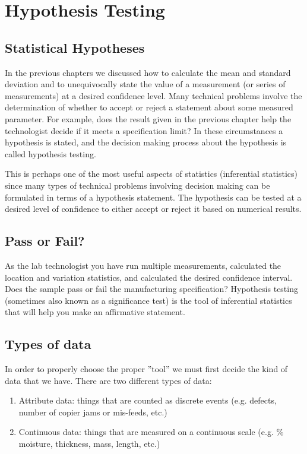 \chapter{Hypothesis Testing}
\section{Statistical Hypotheses}
In the previous chapters we discussed how to calculate the mean and standard deviation and to unequivocally state the value of a measurement (or series of measurements) at a desired confidence level.  Many technical problems involve the determination of whether to accept or reject a statement about some measured parameter.  For example, does the result given in the previous chapter help the technologist decide if it meets a specification limit?  In these circumstances a hypothesis is stated, and the decision making process about the hypothesis is called hypothesis testing.

This is perhaps one of the most useful aspects of statistics (inferential statistics) since many types of technical problems involving decision making can be formulated in terms of a hypothesis statement. The hypothesis can be tested at a desired level of confidence to either accept or reject it based on numerical results.

\section{Pass or Fail?}
As the lab technologist you have run multiple measurements, calculated the location and variation statistics, and calculated the desired confidence interval.  Does the sample pass or fail the manufacturing specification?  Hypothesis testing (sometimes also known as a significance test) is the tool of inferential statistics that will help you make an affirmative statement.

\section{Types of data}
In order to properly choose the proper ''tool'' we must first decide the kind of data that we have. There are two different types of data:
\begin{enumerate}
\item Attribute data: things that are counted as discrete events (e.g. defects, number of copier jams or mis-feeds, etc.)
\item Continuous data: things that are measured on a continuous scale (e.g. \% moisture, thickness, mass, length, etc.)
\end{enumerate}

